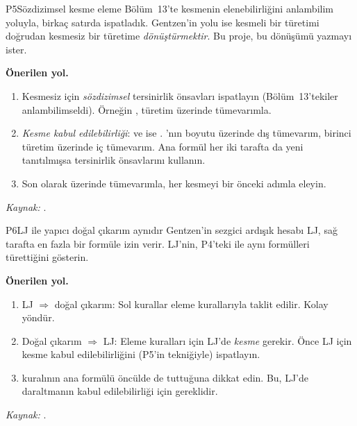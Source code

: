 \begin{projekarti}{P5}{Sözdizimsel kesme eleme}
Bölüm~13'te kesmenin elenebilirliğini anlambilim yoluyla, birkaç satırda
ispatladık. Gentzen'in yolu ise kesmeli bir türetimi doğrudan kesmesiz bir
türetime \emph{dönüştürmektir}. Bu proje, bu dönüşümü yazmayı ister.


\textbf{Önerilen yol.}
\begin{enumerate}[nosep]
  \item Kesmesiz  için \emph{sözdizimsel} tersinirlik önsavları
        ispatlayın (Bölüm~13'tekiler anlambilimseldi). Örneğin , türetim üzerinde
        tümevarımla.
  \item \emph{Kesme kabul edilebilirliği}:  ve
         ise . 'nın boyutu
        üzerinde dış tümevarım, birinci türetim üzerinde iç tümevarım.
        Ana formül her iki tarafta da yeni tanıtılmışsa tersinirlik
        önsavlarını kullanın.
  \item Son olarak  üzerinde tümevarımla, her kesmeyi bir
        önceki adımla eleyin.
\end{enumerate}
\emph{Kaynak:} \citet{gentzen1935,pfenning2000,negri2001}.
\end{projekarti}

\begin{projekarti}{P6}{LJ ile yapıcı doğal çıkarım aynıdır}
Gentzen'in sezgici ardışık hesabı LJ, sağ tarafta en fazla bir formüle izin
verir. LJ'nin, P4'teki  ile aynı formülleri türettiğini
gösterin.


\textbf{Önerilen yol.}
\begin{enumerate}[nosep]
  \item LJ $\Rightarrow$ doğal çıkarım: Sol kurallar eleme kurallarıyla
        taklit edilir. Kolay yöndür.
  \item Doğal çıkarım $\Rightarrow$ LJ: Eleme kuralları için LJ'de
        \emph{kesme} gerekir. Önce LJ için kesme kabul edilebilirliğini
        (P5'in tekniğiyle) ispatlayın.
  \item {} kuralının ana formülü öncülde de tuttuğuna dikkat edin.
        Bu, LJ'de daraltmanın kabul edilebilirliği için gereklidir.
\end{enumerate}
\emph{Kaynak:} \citet{negri2001,prawitz1965,dyckhoff1992}.
\end{projekarti}

